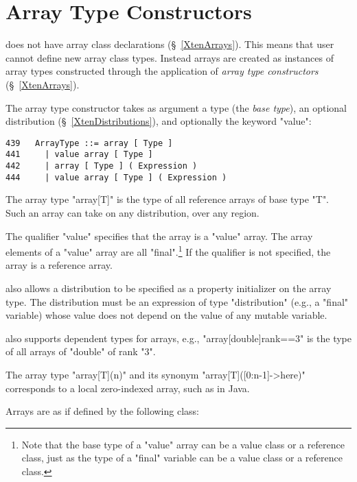 \section{Array Type Constructors}
\label{ArrayTypeConstructors}

{}\XtenCurrVer{} does not have array class declarations
(\S~\ref{XtenArrays}). This means that user cannot define new array
class types. Instead arrays are created as instances of array types
constructed through the application of {\em array type constructors}
(\S~\ref{XtenArrays}).

The array type constructor takes as argument a type (the {\em base
type}), an optional distribution (\S~\ref{XtenDistributions}), and
optionally the keyword \xcd"value":
\begin{verbatim}
439   ArrayType ::= array [ Type ]
441     | value array [ Type ]
442     | array [ Type ] ( Expression )
444     | value array [ Type ] ( Expression )
\end{verbatim}

The array type \xcd"array[T]" is the type of all
reference arrays of base type \xcd"T". Such an array can take on any
distribution, over any region. 

The qualifier \xcd"value" specifies that the array
is a \xcd"value" array. The array elements of a \xcd"value" array are
all \xcd"final".\footnote{Note that the base type of a \xcd"value" array can be a value class or a reference class, just as the 
type of a \xcd"final" variable can be a value class or a reference class.}
If the qualifier is not specified, the array is a reference array.

\XtenCurrVer{} also allows a distribution to be specified 
as a property initializer on the array type.
The distribution must be an expression of type
\xcd"distribution" (e.g., a \xcd"final" variable) whose
value does not depend on the value of any mutable variable.

\Xten{} also supports dependent types for arrays,
e.g.,
\xcd"array[double]{rank==3}" is the type of all arrays of 
\xcd"double" of rank \xcd"3".

The array type
\xcd"array[T](n)" and its synonym
\xcd"array[T]([0:n-1]->here)" corresponds to a local
zero-indexed array, such as in Java.


Arrays are as if defined by the following class:

\fi
